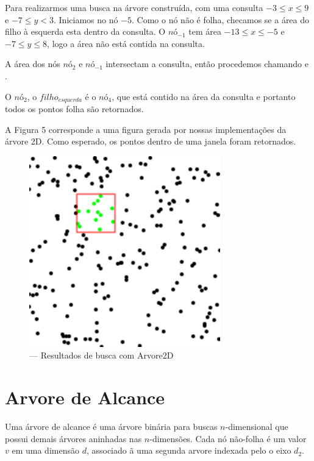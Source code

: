 Para realizarmos uma busca na árvore construída, com uma consulta $ -3 \leq x \leq 9 $ e $-7 \leq y < 3$.
Iniciamos no nó $-5$. Como o nó não é folha, checamos se a área do filho à esquerda esta dentro da consulta.
O $nó_{-1}$ tem área $ -13 \leq x \leq -5 $ e  $ -7 \leq y \leq 8$, logo a área não está contida 
na consulta.

A área dos nós $nó_2$ e $nó_{-1}$ intersectam a consulta, então procedemos chamando
 e .

O $nó_{2}$, o $filho_{esquerda}$ é o $nó_4$, que está contido na área da consulta e portanto todos
os pontos folha são retornados.


A Figura 5 corresponde a uma figura gerada por nossas implementações da árvore 2D. Como esperado, os
pontos dentro de uma janela foram retornados.
\begin{figure}[H]
    \caption{\label{fig:Fig_5} — Resultados de busca com Arvore2D}
    \begin{center}
        \includegraphics{images/points.pdf}
    \end{center}
\end{figure}
\clearpage



\section{Arvore de Alcance}

Uma árvore de alcance é uma árvore binária para buscas $n$-dimensional que possui demais árvores aninhadas
nas $n$-dimensões.
Cada nó não-folha é um valor $v$ em uma dimensão $d$, associado ã uma segunda arvore indexada pelo o 
eixo $d_2$.

